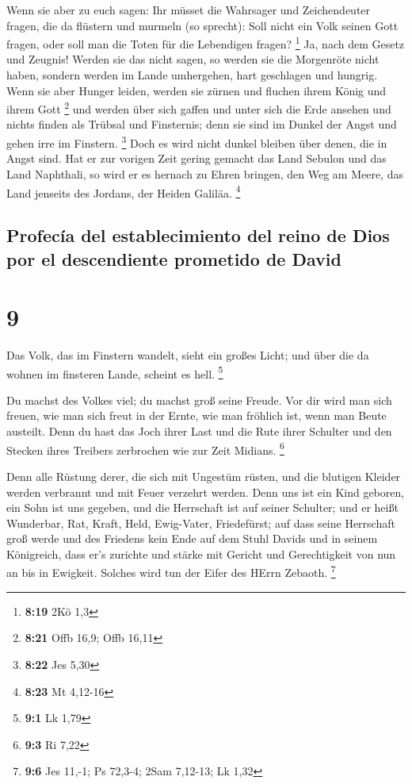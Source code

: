  Wenn sie aber zu euch sagen: Ihr müsset die Wahrsager
und Zeichendeuter fragen, die da flüstern und murmeln (so sprecht): Soll
nicht ein Volk seinen Gott fragen, oder soll man die Toten für die
Lebendigen fragen? \footnote{\textbf{8:19} 2Kö 1,3}  Ja,
nach dem Gesetz und Zeugnis! Werden sie das nicht sagen, so werden sie
die Morgenröte nicht haben,  sondern werden im Lande
umhergehen, hart geschlagen und hungrig. Wenn sie aber Hunger leiden,
werden sie zürnen und fluchen ihrem König und ihrem Gott \footnote{\textbf{8:21}
  Offb 16,9; Offb 16,11}  und werden über sich gaffen und
unter sich die Erde ansehen und nichts finden als Trübsal und
Finsternis; denn sie sind im Dunkel der Angst und gehen irre im
Finstern. \footnote{\textbf{8:22} Jes 5,30}  Doch es wird
nicht dunkel bleiben über denen, die in Angst sind. Hat er zur vorigen
Zeit gering gemacht das Land Sebulon und das Land Naphthali, so wird er
es hernach zu Ehren bringen, den Weg am Meere, das Land jenseits des
Jordans, der Heiden Galiläa. \footnote{\textbf{8:23} Mt 4,12-16}

\hypertarget{profecuxeda-del-establecimiento-del-reino-de-dios-por-el-descendiente-prometido-de-david}{%
\subsection{Profecía del establecimiento del reino de Dios por el
descendiente prometido de
David}\label{profecuxeda-del-establecimiento-del-reino-de-dios-por-el-descendiente-prometido-de-david}}

\hypertarget{section-8}{%
\section{9}\label{section-8}}

 Das Volk, das im Finstern wandelt, sieht ein großes
Licht; und über die da wohnen im finsteren Lande, scheint es hell.
\footnote{\textbf{9:1} Lk 1,79}

 Du machst des Volkes viel; du machst groß seine Freude.
Vor dir wird man sich freuen, wie man sich freut in der Ernte, wie man
fröhlich ist, wenn man Beute austeilt.  Denn du hast das
Joch ihrer Last und die Rute ihrer Schulter und den Stecken ihres
Treibers zerbrochen wie zur Zeit Midians. \footnote{\textbf{9:3} Ri 7,22}

 Denn alle Rüstung derer, die sich mit Ungestüm rüsten,
und die blutigen Kleider werden verbrannt und mit Feuer verzehrt werden.
 Denn uns ist ein Kind geboren, ein Sohn ist uns gegeben,
und die Herrschaft ist auf seiner Schulter; und er heißt Wunderbar, Rat,
Kraft, Held, Ewig-Vater, Friedefürst;  auf dass seine
Herrschaft groß werde und des Friedens kein Ende auf dem Stuhl Davids
und in seinem Königreich, dass er's zurichte und stärke mit Gericht und
Gerechtigkeit von nun an bis in Ewigkeit. Solches wird tun der Eifer des
HErrn Zebaoth. \footnote{\textbf{9:6} Jes 11,-1; Ps 72,3-4; 2Sam
  7,12-13; Lk 1,32}

